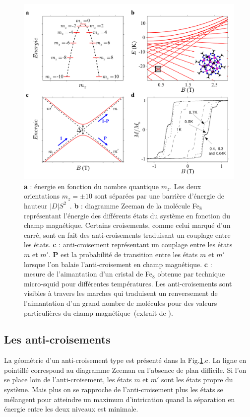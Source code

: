 \begin{figure}
\centering \includegraphics[scale=0.45]{Theorie/MagMol/figure3/figure3.pdf} 
\caption{\textbf{a} : énergie en fonction du nombre quantique $m_z$. Les deux orientations $m_z=\pm 10$ sont séparées par une barrière d'énergie de hauteur $|D|S^2$~\cite{Bogani2008}. \textbf{b} : diagramme Zeeman de la molécule Fe$_8$ représentant l'énergie des différents états du système en fonction du champ magnétique. Certains croisements, comme celui marqué d'un carré, sont en fait des anti-croisements traduisant un couplage entre les états. \textbf{c} : anti-croisement représentant un couplage entre les états $m$ et $m'$. \textbf{P} est la probabilité de transition entre les états $m$ et $m'$ lorsque l'on balaie l'anti-croisement en champ magnétique. \textbf{c} : mesure de l'aimantation d'un cristal de Fe$_8$ obtenue par technique micro-squid pour différentes températures. Les anti-croisements sont visibles à travers les marches qui traduisent un renversement de l'aimantation d'un grand nombre de molécules pour des valeurs particulières du champ magnétique~(extrait de \cite{MagGoesNano}).}
\label{Fe8Zeeman}
\end{figure}

\subsection{Les anti-croisements}
La géométrie d'un anti-croisement type est présenté dans la Fig.\ref{Fe8Zeeman}.c. La ligne en pointillé correspond au diagramme Zeeman en l'absence de plan difficile. Si l'on se place loin de l'anti-croisement, les états $m$ et $m'$ sont les états propre du système. Mais plus on se rapproche de l'anti-croisement plus les états se mélangent pour atteindre un maximum d'intrication quand la séparation en énergie entre les deux niveaux est minimale.

